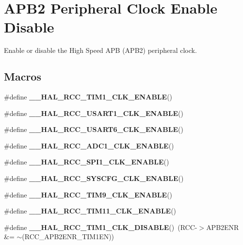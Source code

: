 \hypertarget{group___r_c_c___a_p_b2___clock___enable___disable}{}\section{A\+P\+B2 Peripheral Clock Enable Disable}
\label{group___r_c_c___a_p_b2___clock___enable___disable}


Enable or disable the High Speed A\+PB (A\+P\+B2) peripheral clock.  


\subsection*{Macros}
\begin{DoxyCompactItemize}
\item 
\#define {\bfseries \+\_\+\+\_\+\+H\+A\+L\+\_\+\+R\+C\+C\+\_\+\+T\+I\+M1\+\_\+\+C\+L\+K\+\_\+\+E\+N\+A\+B\+LE}()
\item 
\#define {\bfseries \+\_\+\+\_\+\+H\+A\+L\+\_\+\+R\+C\+C\+\_\+\+U\+S\+A\+R\+T1\+\_\+\+C\+L\+K\+\_\+\+E\+N\+A\+B\+LE}()
\item 
\#define {\bfseries \+\_\+\+\_\+\+H\+A\+L\+\_\+\+R\+C\+C\+\_\+\+U\+S\+A\+R\+T6\+\_\+\+C\+L\+K\+\_\+\+E\+N\+A\+B\+LE}()
\item 
\#define {\bfseries \+\_\+\+\_\+\+H\+A\+L\+\_\+\+R\+C\+C\+\_\+\+A\+D\+C1\+\_\+\+C\+L\+K\+\_\+\+E\+N\+A\+B\+LE}()
\item 
\#define {\bfseries \+\_\+\+\_\+\+H\+A\+L\+\_\+\+R\+C\+C\+\_\+\+S\+P\+I1\+\_\+\+C\+L\+K\+\_\+\+E\+N\+A\+B\+LE}()
\item 
\#define {\bfseries \+\_\+\+\_\+\+H\+A\+L\+\_\+\+R\+C\+C\+\_\+\+S\+Y\+S\+C\+F\+G\+\_\+\+C\+L\+K\+\_\+\+E\+N\+A\+B\+LE}()
\item 
\#define {\bfseries \+\_\+\+\_\+\+H\+A\+L\+\_\+\+R\+C\+C\+\_\+\+T\+I\+M9\+\_\+\+C\+L\+K\+\_\+\+E\+N\+A\+B\+LE}()
\item 
\#define {\bfseries \+\_\+\+\_\+\+H\+A\+L\+\_\+\+R\+C\+C\+\_\+\+T\+I\+M11\+\_\+\+C\+L\+K\+\_\+\+E\+N\+A\+B\+LE}()
\item 
\#define {\bfseries \+\_\+\+\_\+\+H\+A\+L\+\_\+\+R\+C\+C\+\_\+\+T\+I\+M1\+\_\+\+C\+L\+K\+\_\+\+D\+I\+S\+A\+B\+LE}()~(R\+CC-\/$>$A\+P\+B2\+E\+NR \&= $\sim$(R\+C\+C\+\_\+\+A\+P\+B2\+E\+N\+R\+\_\+\+T\+I\+M1\+EN))\hypertarget{group___r_c_c___a_p_b2___clock___enable___disable_gaa9eacfb8ee244074ec63dae0b9f621c2}{}\label{group___r_c_c___a_p_b2___clock___enable___disable_gaa9eacfb8ee244074ec63dae0b9f621c2}


\end{DoxyCompactItemize}
